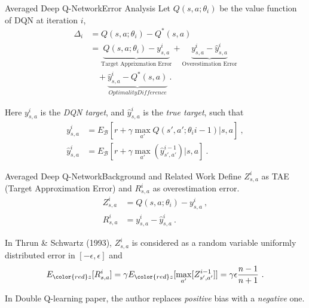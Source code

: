 \documentclass{beamer}
\newcommand{\red}[1]{{\color{red} #1}}
\newcommand{\qi}{Q(s,a; \theta_i)}
\begin{document}
\begin{frame}{Averaged Deep Q-Network}{Error Analysis}
Let $Q(s,a; \theta_i)$ be the value function of DQN at iteration $i$,
\begin{equation}
\begin{aligned}
	\Delta_i &= \qi - Q^*(s,a) \\
	&= \underbrace{\qi - y_{s,a}^i}_{\text{Target Apprixmation Error}} + \underbrace{y_{s,a}^i - \hat{y}_{s,a}^i}_{\text{Overestimation Error}} \\
	&~~~~ + \underbrace{ \hat{y}_{s,a}^i - Q^*(s,a)}_{Optimality Difference} ~.
\end{aligned}
\end{equation}

Here $y_{s,a}^i$ is the \textit{DQN target}, and $\hat{y}_{s,a}^i$ is the \textit{true target}, such that
\begin{equation}
\begin{aligned}
	y_{s,a}^i &= E_{\mathcal{B}} \left[ r + \gamma \max_{a'} Q(s', a'; \theta_i{i-1}) | s,a \right] ~,\\
	\hat{y}_{s,a}^i &= E_{\mathcal{B}} \left[ r + \gamma \max_{a'} ( \hat{y}^{i-1}_{s',a'} ) | s,a \right] ~.
\end{aligned}
\end{equation}
\end{frame}

\begin{frame}{Averaged Deep Q-Network}{Background and Related Work}
Define $Z_{s,a}^i$ as TAE (Target Approximation Error) and $R_{s,a}^i$ as overestimation error.
	\begin{equation}
	\begin{aligned}
		Z_{s,a}^i &= Q(s,a; \theta_i) - y_{s,a}^i ~,\\
		R_{s,a}^i &= y_{s,a}^i - \hat{y}_{s,a}^i ~.
	\end{aligned}
	\end{equation}
	
In Thrun \& Schwartz (1993), $Z_{s,a}^i$ is considered as a random variable uniformly distributed error in $[-\epsilon, \epsilon]$ and
\begin{equation}
	E_{\red{z}}[R_{s,a}^i] = \gamma E_{\red{z}}[\max_{a'}[Z_{s',a'}^{i-1}]] = \gamma \epsilon \frac{n-1}{n+1} ~.
\end{equation}

In Double Q-learning paper, the author replaces \textit{positive} bias with a \textit{negative} one.
\end{frame}
\end{document}
